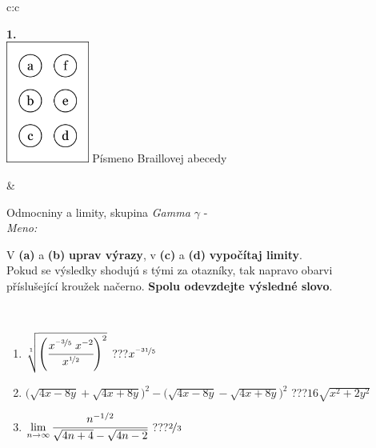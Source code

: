 \documentclass[10pt]{report}
\begin{document}
\begin{tabular}{c:c}
\begin{minipage}[c][104.5mm][t]{0.5\linewidth}
\begin{center}
\begin{minipage}{0.20\linewidth}
\begin{center}
{\Huge\bfseries 1.} \\[2mm]
\includegraphics[height=40mm]{../images/braille.png}
{\small Písmeno Braillovej abecedy}
\end{center}
\end{minipage}
\end{center}
\end{minipage}
&
\begin{minipage}[c][104.5mm][t]{0.5\linewidth}
\begin{center}
\vspace{7mm}
{\huge Odmocniny a limity, skupina \textit{Gamma $\gamma$} -}\\[5mm]
\textit{Meno:}\phantom{xxxxxxxxxxxxxxxxxxxxxxxxxxxxxxxxxxxxxxxxxxxxxxxxxxxxxxxxxxxxxxxxx}\\[5mm]
\begin{minipage}{0.95\linewidth}
\begin{center}
V \textbf{(a)} a \textbf{(b)} \textbf{uprav výrazy}, v \textbf{(c)} a \textbf{(d)} \textbf{vypočítaj limity}.\\Pokud se výsledky shodujú s tými za otazníky, tak napravo obarvi\\příslušející kroužek načerno. \textbf{Spolu odevzdejte výsledné slovo}.
\end{center}
\end{minipage}
\\[1mm]
\begin{minipage}{0.79\linewidth}
\begin{center}
\begin{varwidth}{\linewidth}
\begin{enumerate}
\small
\item $\sqrt[1]{\left(\cfrac{x^{\nicefrac{-3}{5}}\;x^{-2}}{x^{\nicefrac{1}{2}}}\right)^{2}}$\quad \dotfill\; ???\;\dotfill \quad $x^{\nicefrac{-31}{5}}$
\item {\footnotesize{\scriptsize$\big(\sqrt{4x-8y}+\sqrt{4x+8y}\big)^2-\big(\sqrt{4x-8y}-\sqrt{4x+8y}\big)^2$}\quad \dotfill\; ???\;\dotfill \quad $16\sqrt{x^2+2y^2}$}
\item $\lim\limits_{n\to\infty}\cfrac{n^{-1/2}}{\sqrt{4n+4}-\sqrt{4n-2}}$\quad \dotfill\; ???\;\dotfill \quad $\nicefrac{2}{3}$

\end{enumerate}
\end{varwidth}
\end{center}
\end{minipage}
\end{center}
\end{minipage}
\end{tabular}
\end{document}
